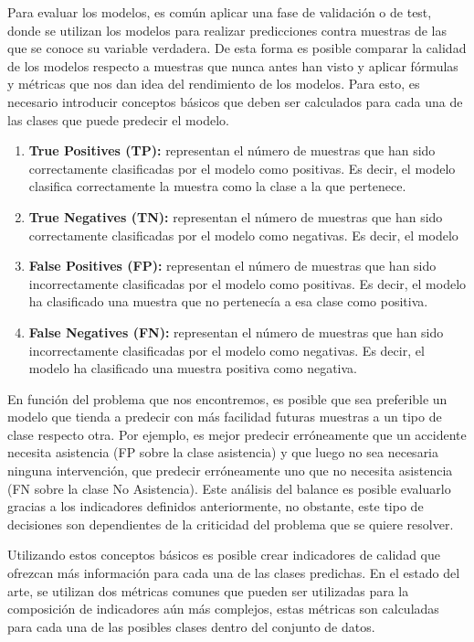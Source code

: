 Para evaluar los modelos, es común aplicar una fase de validación o de test, donde se utilizan los modelos para realizar predicciones contra muestras de las que se conoce su variable verdadera. De esta forma es posible comparar la calidad de los modelos respecto a muestras que nunca antes han visto y aplicar fórmulas y métricas que nos dan idea del rendimiento de los modelos. Para esto, es necesario introducir conceptos básicos que deben ser calculados para cada una de las clases que puede predecir el modelo.

\begin{enumerate}
	\item \textbf{True Positives (TP):} representan el número de muestras que han sido correctamente clasificadas por el modelo como positivas. Es decir, el modelo clasifica correctamente la muestra como la clase a la que pertenece.
	\item \textbf{True Negatives (TN):} representan el número de muestras que han sido correctamente clasificadas por el modelo como negativas. Es decir, el modelo
	\item \textbf{False Positives (FP):} representan el número de muestras que han sido incorrectamente clasificadas por el modelo como positivas. Es decir, el modelo ha clasificado una muestra que no pertenecía a esa clase como positiva.
	\item \textbf{False Negatives (FN):} representan el número de muestras que han sido incorrectamente clasificadas por el modelo como negativas. Es decir, el modelo ha clasificado una muestra positiva como negativa.
\end{enumerate}

En función del problema que nos encontremos, es posible que sea preferible un modelo que tienda a predecir con más facilidad futuras muestras a un tipo de clase respecto otra. Por ejemplo, es mejor predecir erróneamente que un accidente necesita asistencia (FP sobre la clase asistencia) y que luego no sea necesaria ninguna intervención, que predecir erróneamente uno que no necesita asistencia (FN sobre la clase No Asistencia). Este análisis del balance es posible evaluarlo gracias a los indicadores definidos anteriormente, no obstante, este tipo de decisiones son dependientes de la criticidad del problema que se quiere resolver.

Utilizando estos conceptos básicos es posible crear indicadores de calidad que ofrezcan más información para cada una de las clases predichas. En el estado del arte, se utilizan dos métricas comunes que pueden ser utilizadas para la composición de indicadores aún más complejos, estas métricas son calculadas para cada una de las posibles clases dentro del conjunto de datos.

